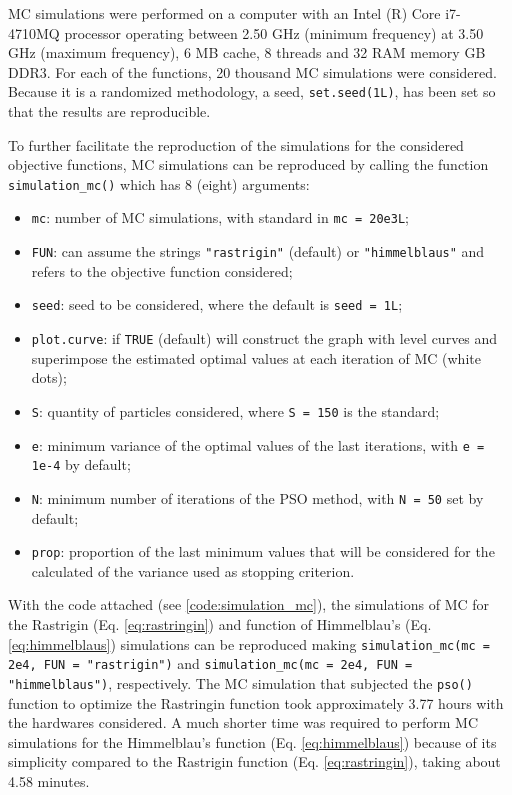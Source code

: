 \documentclass[10pt,letterpaper]{article}
\begin{document}
MC simulations were performed on a computer with an Intel (R) Core i7-4710MQ processor operating between 2.50 GHz (minimum frequency) at 3.50 GHz (maximum frequency), 6 MB cache, 8 threads and 32 RAM memory GB DDR3. For each of the functions, 20 thousand MC simulations were considered. Because it is a randomized methodology, a seed, \texttt{set.seed(1L)}, has been set so that the results are reproducible. 

To further facilitate the reproduction of the simulations for the considered objective functions, MC simulations can be reproduced by calling the function \texttt{simulation\_mc()} which has 8 (eight) arguments:
\begin{itemize}
	\item \texttt{mc}: number of MC simulations, with standard in \texttt{mc = 20e3L};
	\item \texttt{FUN}: can assume the strings \texttt{"rastrigin"} (default) or \texttt{"himmelblaus"} and refers to the objective function considered;
	\item \texttt{seed}: seed to be considered, where the default is \texttt{seed = 1L};
	\item \texttt{plot.curve}: if \texttt{TRUE} (default) will construct the graph with level curves and superimpose the estimated optimal values at each iteration of MC (white dots);
	\item \texttt{S}: quantity of particles considered, where \texttt{S = 150} is the standard;
	\item \texttt{e}: minimum variance of the optimal values of the last iterations, with \texttt{e = 1e-4} by default;
	\item \texttt{N}: minimum number of iterations of the PSO method, with \texttt{N = 50} set by default;
	\item \texttt{prop}: proportion of the last minimum values that will be considered for the calculated of the variance used as stopping criterion.
\end{itemize} 


With the code attached (see \ref{code:simulation_mc}), the simulations of MC for the Rastrigin (Eq. \ref{eq:rastringin}) and function of Himmelblau's (Eq. \ref{eq:himmelblaus}) simulations can be reproduced making \texttt{simulation\_mc(mc = 2e4, FUN = "rastrigin")} and \texttt{simulation\_mc(mc = 2e4, FUN = "himmelblaus")}, respectively. The MC simulation that subjected the \texttt{pso()} function to optimize the Rastringin function took approximately 3.77 hours with the hardwares considered. A much shorter time was required to perform MC simulations for the Himmelblau's function (Eq. \ref{eq:himmelblaus}) because of its simplicity compared to the Rastrigin function (Eq. \ref{eq:rastringin}), taking about 4.58 minutes.
\end{document}
